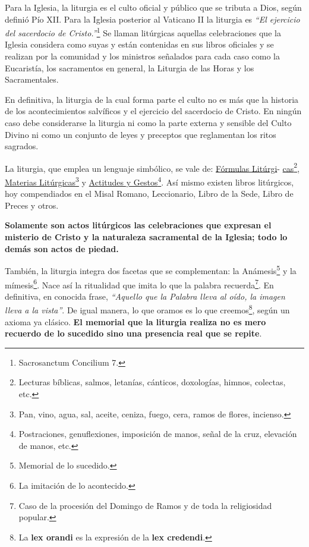 \documentclass[letterpaper, 12pt]{book}
\begin{document}
    Para la Iglesia, la liturgia es el culto oficial y p\'ublico que se tributa a Dios, seg\'un defini\'o P\'io XII. Para la Iglesia posterior al Vaticano II la liturgia es \textit{``El ejercicio del sacerdocio de Cristo.''}\footnote{Sacrosanctum Concilium 7.} Se llaman lit\'urgicas aquellas celebraciones que la Iglesia considera como suyas y est\'an contenidas en sus libros oficiales y se realizan por la comunidad y los ministros se\~nalados para cada caso como la Eucarist\'ia, los sacramentos en general, la Liturgia de las Horas y los Sacramentales.\newline
    
    En definitiva, la liturgia de la cual forma parte el culto no es m\'as que la historia de los acontecimientos salv\'ificos y el ejercicio del sacerdocio de Cristo. En ning\'un caso debe considerarse la liturgia ni como la parte externa y sensible del Culto Divino ni como un conjunto de leyes y preceptos que reglamentan los ritos sagrados.\newline
    
    La liturgia, que emplea un lenguaje simb\'olico, se vale de: \underline{F\'ormulas Lit\'urgi}- \underline{cas}\footnote{Lecturas b\'iblicas, salmos, letan\'ias, c\'anticos, doxolog\'ias, himnos, colectas, etc.}, \underline{Materias Lit\'urgicas}\footnote{Pan, vino, agua, sal, aceite, ceniza, fuego, cera, ramos de flores, incienso.} y \underline{Actitudes y Gestos}\footnote{Postraciones, genuflexiones, imposici\'on de manos, se\~nal de la cruz, elevaci\'on de manos, etc.}. As\'i mismo existen libros lit\'urgicos, hoy compendiados en el Misal Romano, Leccionario, Libro de la Sede, Libro de Preces y otros.\newline
    
    \textbf{Solamente son actos lit\'urgicos las celebraciones que expresan el misterio de Cristo y la naturaleza sacramental de la Iglesia; todo lo dem\'as son actos de piedad.}\newline
    
    Tambi\'en, la liturgia integra dos facetas que se complementan: la An\'amesis\footnote{Memorial de lo sucedido.} y la m\'imesis\footnote{La imitaci\'on de lo acontecido.}. Nace as\'i la ritualidad que imita lo que la palabra recuerda\footnote{Caso de la procesi\'on del Domingo de Ramos y de toda la religiosidad popular.}. En definitiva, en conocida frase, \textit{``Aquello que la Palabra lleva al o\'ido, la imagen lleva a la vista''}. De igual manera, lo que oramos es lo que creemos\footnote{La \textbf{lex orandi} es la expresi\'on de la \textbf{lex credendi}.}, seg\'un un axioma ya cl\'asico. \textbf{El memorial que la liturgia realiza no es mero recuerdo de lo sucedido sino una presencia real que se repite}.
    
\end{document}
